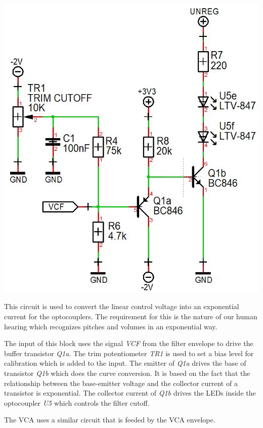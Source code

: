 \documentclass{scrartcl}
\begin{document}
\begin{center}
    \includegraphics[scale=0.40]{assets/schema-expo-vcf.png}
\end{center}

This circuit is used to convert the linear control voltage into an exponential current for the optocouplers. The requirement for this is the nature of our human hearing which recognizes pitches and volumes in an exponential way.

The input of this block uses the signal \emph{VCF} from the filter envelope to drive the buffer transistor \emph{Q1a}. The trim potentiometer \emph{TR1} is used to set a bias level for calibration which is added to the input. The emitter of \emph{Q1a} drives the base of transistor \emph{Q1b} which does the curve conversion. It is based on the fact that the relationship between the base-emitter voltage and the collector current of a transistor is exponential. The collector current of \emph{Q1b} drives the LEDs inside the optocoupler \emph{U5} which controls the filter cutoff.

The VCA uses a similar circuit that is feeded by the VCA envelope.
\end{document}
